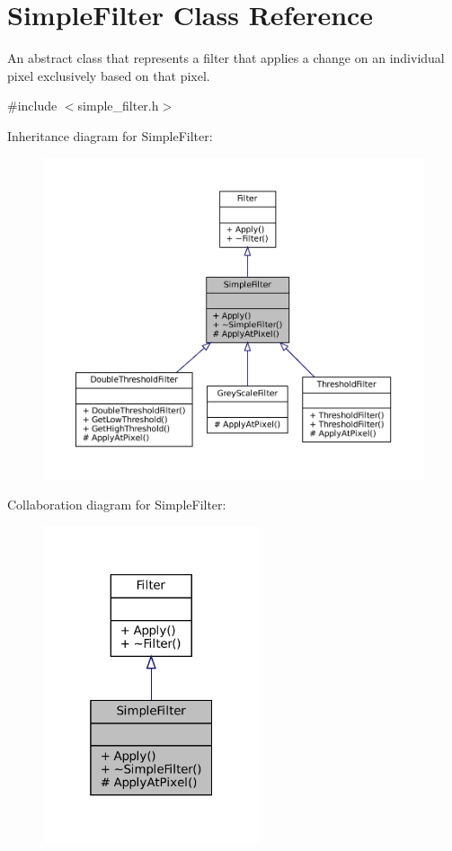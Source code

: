 \hypertarget{classSimpleFilter}{}\section{Simple\+Filter Class Reference}
\label{classSimpleFilter}


An abstract class that represents a filter that applies a change on an individual pixel exclusively based on that pixel.  




{\ttfamily \#include $<$simple\+\_\+filter.\+h$>$}



Inheritance diagram for Simple\+Filter\+:\nopagebreak
\begin{figure}[H]
\begin{center}
\leavevmode
\includegraphics[width=350pt]{classSimpleFilter__inherit__graph}
\end{center}
\end{figure}


Collaboration diagram for Simple\+Filter\+:\nopagebreak
\begin{figure}[H]
\begin{center}
\leavevmode
\includegraphics[width=181pt]{classSimpleFilter__coll__graph}
\end{center}
\end{figure}
